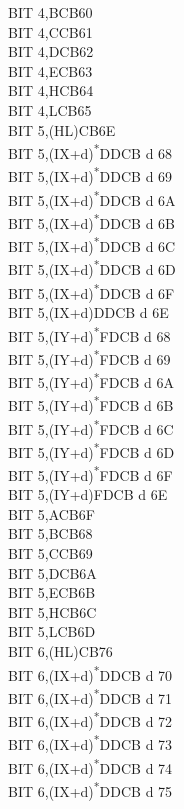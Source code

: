 \documentclass[oneside,a4paper]{book}
\begin{document}
\begin{multicols}{3}
{\begin{tabbing}
BIT 4,B\>CB60\\
BIT 4,C\>CB61\\
BIT 4,D\>CB62\\
BIT 4,E\>CB63\\
BIT 4,H\>CB64\\
BIT 4,L\>CB65\\
BIT 5,(HL)\>CB6E\\
BIT 5,(IX+d)\textsuperscript{*}\>DDCB d 68\\
BIT 5,(IX+d)\textsuperscript{*}\>DDCB d 69\\
BIT 5,(IX+d)\textsuperscript{*}\>DDCB d 6A\\
BIT 5,(IX+d)\textsuperscript{*}\>DDCB d 6B\\
BIT 5,(IX+d)\textsuperscript{*}\>DDCB d 6C\\
BIT 5,(IX+d)\textsuperscript{*}\>DDCB d 6D\\
BIT 5,(IX+d)\textsuperscript{*}\>DDCB d 6F\\
BIT 5,(IX+d)\>DDCB d 6E\\
BIT 5,(IY+d)\textsuperscript{*}\>FDCB d 68\\
BIT 5,(IY+d)\textsuperscript{*}\>FDCB d 69\\
BIT 5,(IY+d)\textsuperscript{*}\>FDCB d 6A\\
BIT 5,(IY+d)\textsuperscript{*}\>FDCB d 6B\\
BIT 5,(IY+d)\textsuperscript{*}\>FDCB d 6C\\
BIT 5,(IY+d)\textsuperscript{*}\>FDCB d 6D\\
BIT 5,(IY+d)\textsuperscript{*}\>FDCB d 6F\\
BIT 5,(IY+d)\>FDCB d 6E\\
BIT 5,A\>CB6F\\
BIT 5,B\>CB68\\
BIT 5,C\>CB69\\
BIT 5,D\>CB6A\\
BIT 5,E\>CB6B\\
BIT 5,H\>CB6C\\
BIT 5,L\>CB6D\\
BIT 6,(HL)\>CB76\\
BIT 6,(IX+d)\textsuperscript{*}\>DDCB d 70\\
BIT 6,(IX+d)\textsuperscript{*}\>DDCB d 71\\
BIT 6,(IX+d)\textsuperscript{*}\>DDCB d 72\\
BIT 6,(IX+d)\textsuperscript{*}\>DDCB d 73\\
BIT 6,(IX+d)\textsuperscript{*}\>DDCB d 74\\
BIT 6,(IX+d)\textsuperscript{*}\>DDCB d 75\\

\end{tabbing}}
\end{multicols}
\end{document}
